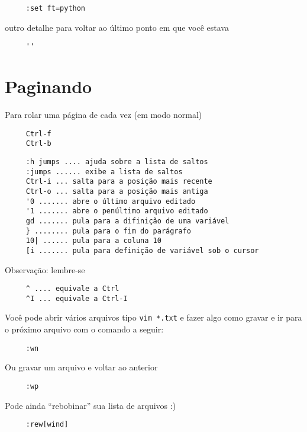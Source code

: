 \begin{verbatim}
     :set ft=python
\end{verbatim}

outro detalhe para voltar ao último ponto em que você estava

\begin{verbatim}
     ''
\end{verbatim}

\section{Paginando}
\label{Paginando}

Para rolar uma página de cada vez (em modo normal)

\begin{verbatim}
     Ctrl-f
     Ctrl-b
\end{verbatim}


\begin{verbatim}
     :h jumps .... ajuda sobre a lista de saltos
     :jumps ...... exibe a lista de saltos
     Ctrl-i ... salta para a posição mais recente
     Ctrl-o ... salta para a posição mais antiga
     '0 ....... abre o último arquivo editado
     '1 ....... abre o penúltimo arquivo editado
     gd ....... pula para a difinição de uma variável
     } ........ pula para o fim do parágrafo
     10| ...... pula para a coluna 10
     [i ....... pula para definição de variável sob o cursor
\end{verbatim}

Observação: lembre-se

\begin{verbatim}
     ^ .... equivale a Ctrl
     ^I ... equivale a Ctrl-I
\end{verbatim}

Você pode abrir vários arquivos tipo \verb|vim *.txt| e fazer
algo como gravar e ir para o próximo arquivo com o comando a
seguir:

\begin{verbatim}
     :wn
\end{verbatim}

Ou gravar um arquivo e voltar ao anterior

\begin{verbatim}
     :wp
\end{verbatim}

Pode ainda ``rebobinar'' sua lista de arquivos :)

\begin{verbatim}
     :rew[wind]
\end{verbatim}

